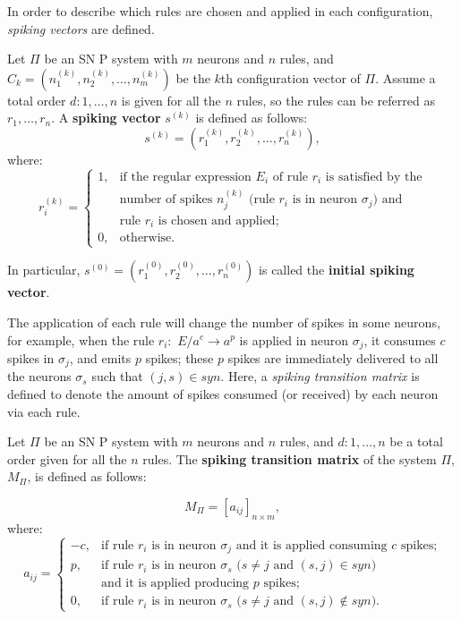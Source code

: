 \documentclass[runningheads]{llncs}
\begin{document}
In order to describe which rules are chosen and applied in each
configuration, {\it spiking vectors} are defined.

\begin{definition} \label{def_spik_vec}
Let $\Pi$ be an SN P system with $m$ neurons and $n$ rules, and
$C_{k} = (n_{1}^{(k)}, n_{2}^{(k)}, \ldots , n_{m}^{(k)})$ be the
$k$th configuration vector of $\Pi$. Assume a total order
$d:1,\dots,n$ is given for all the $n$ rules, so the rules can be
referred as $r_1,\dots, r_n$. A {\bf spiking vector} $s^{(k)}$ is
defined as follows:
$$s^{(k)} = (r_1^{(k)}, r_2^{(k)}, \ldots , r_n^{(k)}),$$
where:
$$
r_{i}^{(k)}= \left\{ \begin{array}{rl}
 1, &\mbox{if the regular expression $E_{i}$ of rule $r_{i}$ is satisfied by the}  \\
  & \mbox {number of spikes $n_{j}^{(k)}$ (rule $r_{i}$ is in neuron $\sigma_j$) and }\\
  & \mbox {rule $r_i$ is chosen and applied};\\
 0, &\mbox{otherwise}.
       \end{array} \right.
$$

In particular, $s^{(0)} = (r_1^{(0)}, r_2^{(0)}, \ldots ,
r_n^{(0)})$ is called the {\bf initial spiking vector}.
\end{definition}

The application of each rule will change the number of spikes in
some neurons, for example, when the rule $r_i:$ $E/a^c\rightarrow
a^p$ is applied in neuron $\sigma_j$, it consumes $c$ spikes in
$\sigma_j$, and emits $p$ spikes; these $p$ spikes are immediately
delivered to all the neurons $\sigma_s$ such that $(j,s)\in syn$.
Here, a \emph{spiking transition matrix} is defined to denote the
amount of spikes consumed (or received) by each neuron via each
rule.

\begin{definition} \label{defi-snp-mat}
Let $\Pi$ be an SN P system with $m$ neurons and $n$ rules, and
$d:1,\dots, n$ be a total order given for all the $n$ rules. The
{\bf spiking transition matrix} of the system $\Pi$, $M_{\Pi}$, is
defined as follows:


$$M_{\Pi} = [a_{ij}]_{n \times m},$$
where:
$$
a_{ij} = \left\{
\begin{array}{rl}
-c, &\mbox{if rule $r_i$ is in neuron $\sigma_j$ and it is applied consuming $c$ spikes;} \\
 p, &\mbox{if rule $r_i$ is in neuron $\sigma_s$ ($s\neq j$ and $(s,j)\in syn$)} \\
 & \mbox{and it is applied producing $p$ spikes;}\\
 0, &\mbox{if rule $r_i$ is in neuron $\sigma_s$ ($s\neq j$ and $(s,j)\notin syn$).}
    \end{array}
\right.
$$
\end{definition}
\end{document}
